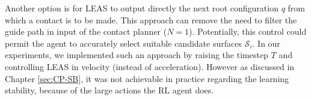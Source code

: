 Another option is for LEAS to output directly the next root configuration $q$ from which a contact is to be made.
This approach can remove the need to filter the guide path in input of the contact planner ($N=1$).
Potentially, this control could permit the agent to accurately select suitable candidate surfaces $\mathcal{S}_i$.
In our experiments, we implemented such an approach by raising the timestep $T$ and controlling LEAS in velocity (instead of acceleration). However as discussed in Chapter \ref{sec:CP-SB}, it was not achievable in practice regarding the learning stability, because of the large actions the RL agent does.

